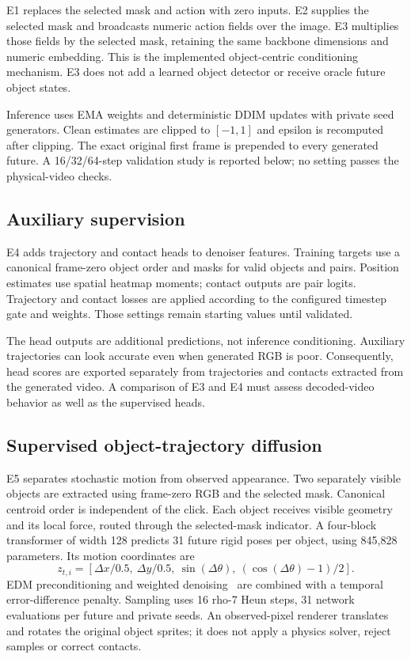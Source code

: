 \documentclass[11pt,a4paper]{article}
\begin{document}
E1 replaces the selected mask and action with zero inputs. E2 supplies the selected mask and broadcasts numeric action fields over the image. E3 multiplies those fields by the selected mask, retaining the same backbone dimensions and numeric embedding. This is the implemented object-centric conditioning mechanism. E3 does not add a learned object detector or receive oracle future object states.

Inference uses EMA weights and deterministic DDIM updates with private seed generators. Clean estimates are clipped to $[-1,1]$ and epsilon is recomputed after clipping. The exact original first frame is prepended to every generated future. A 16/32/64-step validation study is reported below; no setting passes the physical-video checks.

\subsection{Auxiliary supervision}
E4 adds trajectory and contact heads to denoiser features. Training targets use a canonical frame-zero object order and masks for valid objects and pairs. Position estimates use spatial heatmap moments; contact outputs are pair logits. Trajectory and contact losses are applied according to the configured timestep gate and weights. Those settings remain starting values until validated.

The head outputs are additional predictions, not inference conditioning. Auxiliary trajectories can look accurate even when generated RGB is poor. Consequently, head scores are exported separately from trajectories and contacts extracted from the generated video. A comparison of E3 and E4 must assess decoded-video behavior as well as the supervised heads.

\subsection{Supervised object-trajectory diffusion}
E5 separates stochastic motion from observed appearance. Two separately visible objects are extracted using frame-zero RGB and the selected mask. Canonical centroid order is independent of the click. Each object receives visible geometry and its local force, routed through the selected-mask indicator. A four-block transformer of width 128 predicts 31 future rigid poses per object, using 845,828 parameters. Its motion coordinates are
\[
 z_{t,i}=\left[\Delta x/0.5,\ \Delta y/0.5,\ \sin(\Delta\theta),\ (\cos(\Delta\theta)-1)/2\right].
\]
EDM preconditioning and weighted denoising~\cite{karras} are combined with a temporal error-difference penalty. Sampling uses 16 rho-7 Heun steps, 31 network evaluations per future and private seeds. An observed-pixel renderer translates and rotates the original object sprites; it does not apply a physics solver, reject samples or correct contacts.
\end{document}
